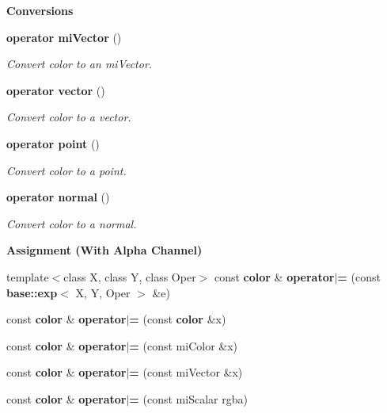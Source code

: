 \begin{Indent}{\bf Conversions}\par
\begin{CompactItemize}
\item 
{\bf operator mi\-Vector} ()
\begin{CompactList}\small\item\em Convert color to an mi\-Vector. \item\end{CompactList}\item 
{\bf operator vector} ()
\begin{CompactList}\small\item\em Convert color to a vector. \item\end{CompactList}\item 
{\bf operator point} ()
\begin{CompactList}\small\item\em Convert color to a point. \item\end{CompactList}\item 
{\bf operator normal} ()
\begin{CompactList}\small\item\em Convert color to a normal. \item\end{CompactList}\end{CompactItemize}
\end{Indent}
\begin{Indent}{\bf Assignment (With Alpha Channel)}\par
\begin{CompactItemize}
\item 
template$<$class X, class Y, class Oper$>$ const {\bf color} \& {\bf operator$|$=} (const {\bf base::exp}$<$ X, Y, Oper $>$ \&e)
\item 
const {\bf color} \& {\bf operator$|$=} (const {\bf color} \&x)
\item 
const {\bf color} \& {\bf operator$|$=} (const mi\-Color \&x)
\item 
const {\bf color} \& {\bf operator$|$=} (const mi\-Vector \&x)
\item 
const {\bf color} \& {\bf operator$|$=} (const mi\-Scalar rgba)
\end{CompactItemize}
\end{Indent}
